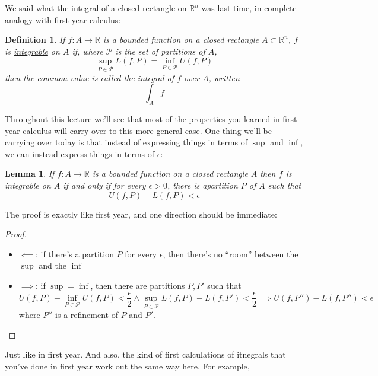 \documentclass{article}
\newtheorem{lemma}{Lemma}
\newtheorem{definition}{Definition}
\newcommand{\reals}[0]{\mathbb{R}}
\newcommand{\mc}[1]{\mathcal{#1}}
\begin{document}
We said what the integral of a closed rectangle on \(\reals^n\) was last time, in complete analogy with first year calculus:
\begin{definition}
  If \(f: A \to \reals\) is a bounded function on a closed rectangle \(A \subset \reals^n\), \(f\) is \underline{integrable} on \(A\) if, where \(\mc{P}\) is the set of partitions of \(A\),
  \begin{equation}\sup_{P \in \mc{P}} L(f, P) = \inf_{P \in \mc{P}} U(f, P)\end{equation}
  then the common value is called the integral of \(f\) over \(A\), written
  \begin{equation}\int_Af\end{equation}
\end{definition}
Throughout this lecture we'll see that most of the properties you learned in first year calculus will carry over to this more general case. One thing we'll be carrying over today is that instead of expressing things in terms of \(\sup\) and \(\inf\), we can instead express things in terms of \(\epsilon\):
\begin{lemma}
  If \(f: A \to \reals\) is a bounded function on a closed rectangle \(A\) then \(f\) is integrable on \(A\) if and only if for every \(\epsilon > 0\), there is apartition \(P\) of \(A\) such that
  \begin{equation}U(f, P) - L(f, P) < \epsilon\end{equation}
\end{lemma}
The proof is exactly like first year, and one direction should be immediate:
\begin{proof}
\begin{itemize}
  \item \(\impliedby\): if there's a partition \(P\) for every \(\epsilon\), then there's no ``room'' between the \(\sup\) and the \(\inf\)
  \item \(\implies\): if \(\sup = \inf\), then there are partitions \(P, P'\) such that
  \begin{equation}U(f, P) - \inf_{P \in \mc{P}} U(f, P) < \frac{\epsilon}{2} \land \sup_{P \in \mc{P}}L(f, P) - L(f, P') < \frac{\epsilon}{2} \implies U(f, P'') - L(f, P'') < \epsilon\end{equation}
  where \(P''\) is a refinement of \(P\) and \(P'\).
\end{itemize}
\end{proof}
Just like in first year. And also, the kind of first calculations of itnegrals that you've done in first year work out the same way here. For example,
\end{document}
